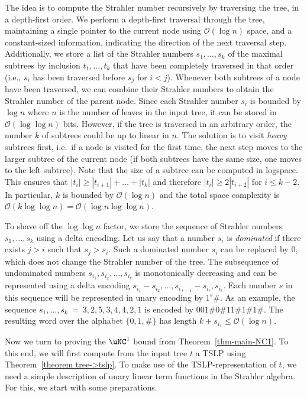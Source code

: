 \documentclass[a4paper,UKenglish,cleveref, autoref, thm-restate, numberwithinsect]{lipics-v2021}
\begin{document}
The idea is to compute the Strahler number recursively by traversing the tree, in a depth-first order.
We perform a depth-first traversal through the tree, maintaining a single pointer to the current node using $\mathcal{O}(\log n)$ space,
and a constant-sized information, indicating the direction of the next traversal step.
Additionally, we store a list of the Strahler numbers $s_1, \dots, s_k$ of the maximal subtrees by inclusion $t_1, \dots, t_k$
that have been completely traversed in that order (i.e., $s_i$ has been traversed before $s_j$ for $i < j$).
Whenever both subtrees of a node have been traversed, we can combine their Strahler numbers to obtain the Strahler number
of the parent node.
Since each Strahler number $s_i$ is bounded by $\log n$ where $n$ is the number of leaves in the input tree, it can be stored
in  $\mathcal{O}(\log \log n)$ bits. However, if the tree is traversed in an arbitrary order, the number $k$ of subtrees could be up to linear in $n$.
The solution is to visit \emph{heavy} subtrees first, i.e.\ if a node is visited for the first time, the next step moves to the larger subtree of the current node (if both subtrees have the same size, one moves to the left subtree).
Note that the size of a subtree can be computed in logspace.
This ensures that $|t_i| \ge |t_{i+1}| + \dots + |t_k|$ and therefore $|t_i| \ge 2|t_{i+2}|$ for $i \leq k-2$. In particular, $k$ is bounded by $\mathcal{O}(\log n)$
and the total space complexity is $\mathcal{O}(k \log \log n)= \mathcal{O}(\log n \log \log n)$.

To shave off the $\log \log n$ factor, we store the sequence of Strahler numbers $s_1, \dots, s_k$ using a delta encoding.
Let us say that a number $s_i$ is \emph{dominated} if there exists $j>i$ such that $s_j > s_i$.
Such a dominated number $s_i$ can be replaced by $0$, which does not change the Strahler number of the tree.
The subsequence of undominated numbers $s_{i_1}, s_{i_2}, \dots, s_{i_\ell}$ is monotonically decreasing
and can be represented using a delta encoding $s_{i_1}-s_{i_2},\ldots, s_{i_{\ell-1}}-s_{i_\ell}, s_{i_\ell}$. Each number
$s$ in this sequence will be represented in unary encoding by $1^s \#$. As an example, the sequence $s_1, \ldots, s_k \ = \ 3,2,5,3,4,4,2,1$ is encoded
by  $001\#0\#11\#1\#1\#$.
The resulting word over the alphabet $\{0,1, \# \}$ has length $k + s_{i_1} \le \mathcal{O}(\log n)$.

Now we turn to proving the $\uNC^1$ bound from Theorem~\ref{thm-main-NC1}. To this end, we will first compute from the input tree $t$ a TSLP using
Theorem~\ref{theorem tree->tslp}. To make use of the TSLP-representation of $t$, we need a simple description of 
unary linear term functions in the Strahler algebra. For this, we start with some preparations.
 
\end{document}
